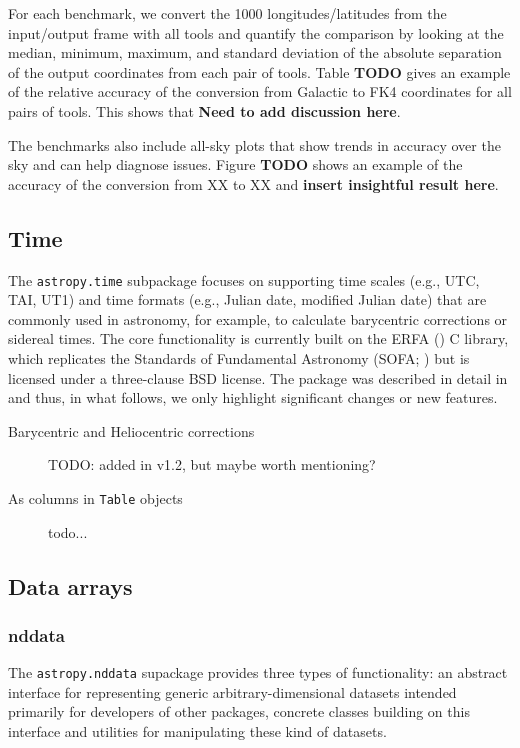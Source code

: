 \documentclass[modern]{aastex61}
\newcommand{\package}[1]{\texttt{#1}\xspace}
\begin{document}
For each benchmark, we convert the 1000 longitudes/latitudes from the input/output frame with all tools and quantify the comparison by looking at the median, minimum, maximum, and standard deviation of the absolute separation of the output coordinates from each pair of tools. Table \textbf{TODO} gives an example of the relative accuracy of the conversion from Galactic to FK4 coordinates for all pairs of tools. This shows that \textbf{Need to add discussion here}.

The benchmarks also include all-sky plots that show trends in accuracy over the sky and can help diagnose issues. Figure \textbf{TODO} shows an example of the accuracy of the conversion from XX to XX and \textbf{insert insightful result here}.

\subsection{Time}
\label{sec:time}

The \package{astropy.time} subpackage focuses on supporting time scales (e.g.,
UTC, TAI, UT1) and time formats (e.g., Julian date, modified Julian date) that
are commonly used in astronomy, for example, to calculate barycentric
corrections or sidereal times.
The core functionality is currently built on the ERFA (\citealt{erfa}) C
library, which replicates the Standards of Fundamental Astronomy (SOFA;
\citealt{sofa}) but is licensed under a three-clause BSD license.
The package was described in detail in \cite{astropy} and thus, in what follows,
we only highlight significant changes or new features.

\begin{description}
    \item[Barycentric and Heliocentric corrections] TODO: added in v1.2, but maybe worth mentioning?
    \item[As columns in \texttt{Table} objects] todo...
\end{description}

\subsection{Data arrays}

\subsubsection{nddata}

The \package{astropy.nddata} supackage provides three types of functionality:
an abstract interface for representing generic arbitrary-dimensional datasets
intended primarily for developers of other packages, concrete classes
building on this interface and utilities for manipulating these kind of
datasets.
\end{document}
